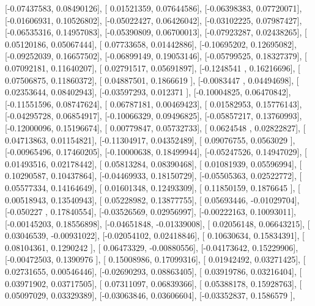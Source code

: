\documentclass{article}
\begin{document}
       [-0.07437583,  0.08490126],
       [ 0.01521359,  0.07644586],
       [-0.06398383,  0.07720071],
       [-0.01606931,  0.10526802],
       [-0.05022427,  0.06426042],
       [-0.03102225,  0.07987427],
       [-0.06535316,  0.14957083],
       [-0.05390809,  0.06700013],
       [-0.07923287,  0.02438265],
       [ 0.05120186,  0.05067444],
       [ 0.07733658,  0.01442886],
       [-0.10695202,  0.12695082],
       [-0.09252039,  0.16657502],
       [-0.06899149,  0.19053146],
       [-0.05799525,  0.18327379],
       [ 0.07092181,  0.11640207],
       [ 0.02791517,  0.05691897],
       [-0.1248541 ,  0.16216696],
       [ 0.07506875,  0.11860372],
       [ 0.04887501,  0.1866619 ],
       [-0.0083447 ,  0.04494698],
       [ 0.02353644,  0.08402943],
       [-0.03597293,  0.012371  ],
       [-0.10004825,  0.06470842],
       [-0.11551596,  0.08747624],
       [ 0.06787181,  0.00469423],
       [ 0.01582953,  0.15776143],
       [-0.04295728,  0.06854917],
       [-0.10066329,  0.09496825],
       [-0.05857217,  0.13760993],
       [-0.12000096,  0.15196674],
       [ 0.00779847,  0.05732733],
       [ 0.0624548 ,  0.02822827],
       [ 0.04713863,  0.01154821],
       [-0.11304917,  0.04352489],
       [ 0.09076755,  0.0563029 ],
       [-0.00965496,  0.17460205],
       [-0.10000638,  0.18499944],
       [-0.05247526,  0.14947029],
       [ 0.01493516,  0.02178442],
       [ 0.05813284,  0.08390468],
       [ 0.01081939,  0.05596994],
       [ 0.10290587,  0.10437864],
       [-0.04469933,  0.18150729],
       [-0.05505363,  0.02522772],
       [ 0.05577334,  0.14164649],
       [ 0.01601348,  0.12493309],
       [ 0.11850159,  0.1876645 ],
       [ 0.00518943,  0.13540943],
       [ 0.05228982,  0.13877755],
       [ 0.05693446, -0.01029704],
       [-0.050227  ,  0.17840554],
       [-0.03526569,  0.02956997],
       [-0.00222163,  0.10093011],
       [-0.00145203,  0.18556898],
       [-0.04651848, -0.01339008],
       [ 0.02056148,  0.06643215],
       [ 0.03046539, -0.00931022],
       [-0.02054102,  0.02418846],
       [ 0.10630634,  0.15834391],
       [ 0.08104361,  0.1290242 ],
       [ 0.06473329, -0.00880556],
       [-0.04173642,  0.15229906],
       [-0.00472503,  0.1390976 ],
       [ 0.15008986,  0.17099316],
       [ 0.01942492,  0.03271425],
       [ 0.02731655,  0.00546446],
       [-0.02690293,  0.08863405],
       [ 0.03919786,  0.03216404],
       [ 0.03971902,  0.03717505],
       [ 0.07311097,  0.06839366],
       [ 0.05388178,  0.15928763],
       [ 0.05097029,  0.03329389],
       [-0.03063846,  0.03606604],
       [-0.03352837,  0.1586579 ],
\end{document}
